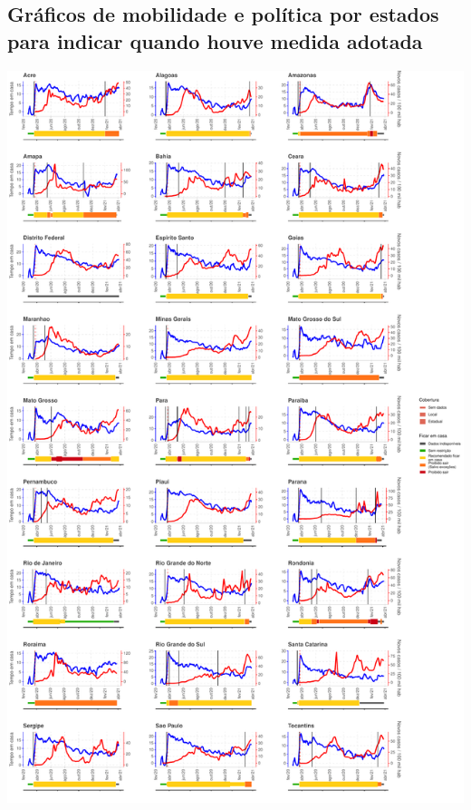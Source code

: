 \documentclass{SelfArx}
\begin{document}
\subsection*{Gráficos de mobilidade e política por estados para indicar quando houve medida adotada}
\label{sec:orge5f4f7d}

\begin{center}
\includegraphics[width=.9\linewidth]{./figs/COVID/Estados/Quando_Policy_selected_C6.pdf}
\end{center}
\end{document}
